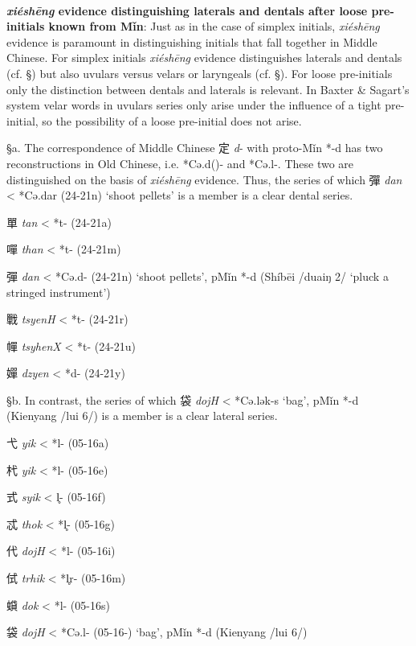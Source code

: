 \paragraph{} 
\textbf{\emph{xiéshēng}
evidence distinguishing laterals and dentals after loose pre-initials
known from Mǐn}: Just as in the case of simplex initials,
 \emph{xiéshēng} evidence is paramount in distinguishing initials that
fall together in Middle Chinese. For simplex initials  \emph{xiéshēng}
evidence distinguishes laterals and dentals (cf. §) but also uvulars
versus velars or laryngeals (cf. §). For loose pre-initials only the
distinction between dentals and laterals is relevant. In Baxter \&
Sagart's system velar words in uvulars series only arise under the
influence of a tight pre-initial, so the possibility of a loose
pre-initial does not arise.

§a. The correspondence of Middle Chinese 定  \emph{d}- with proto-Mǐn *-d
has two reconstructions in Old Chinese, i.e. *Cə.d({})- and *Cə.l{}-.
These two are distinguished on the basis of  \emph{xiéshēng} evidence.
Thus, the series of which 彈 \emph{dan} \textless{} *Cə.d{}ar (24-21n)
`shoot pellets' is a member is a clear dental series.

\begin{description} \item
單  \emph{tan} \textless{} *t{}- (24-21a)
\item
嘽  \emph{than} \textless{} *t{}{}- (24-21m)
\item
彈  \emph{dan} \textless{} *Cə.d{}- (24-21n) `shoot pellets', pMǐn *-d
(Shíbēi /duaiŋ 2/ `pluck a stringed instrument')
\item
戰  \emph{tsyenH} \textless{} *t- (24-21r)
\item
幝  \emph{tsyhenX} \textless{} *t{}- (24-21u)
\item
嬋  \emph{dzyen} \textless{} *d- (24-21y)
\end{description}

§b. In contrast, the series of which 袋  \emph{dojH} \textless{}
*Cə.l{}ək-s `bag', pMǐn *-d (Kienyang /lui 6/) is a member is a clear
lateral series.

\begin{description} \item
弋  \emph{yik} \textless{} *l- (05-16a)
\item
杙  \emph{yik} \textless{} *l- (05-16e)
\item
式  \emph{syik} \textless{} l̥- (05-16f)
\item
忒  \emph{thok} \textless{} *l̥{}- (05-16g)
\item
代  \emph{dojH} \textless{} *l{}- (05-16i)
\item
侙  \emph{trhik} \textless{} *l̥r- (05-16m)
\item
蟘  \emph{dok} \textless{} *l{}- (05-16s)
\item
袋 \emph{dojH} \textless{} *Cə.l{}- (05-16-) `bag', pMǐn *-d (Kienyang
/lui 6/)
\end{description}

